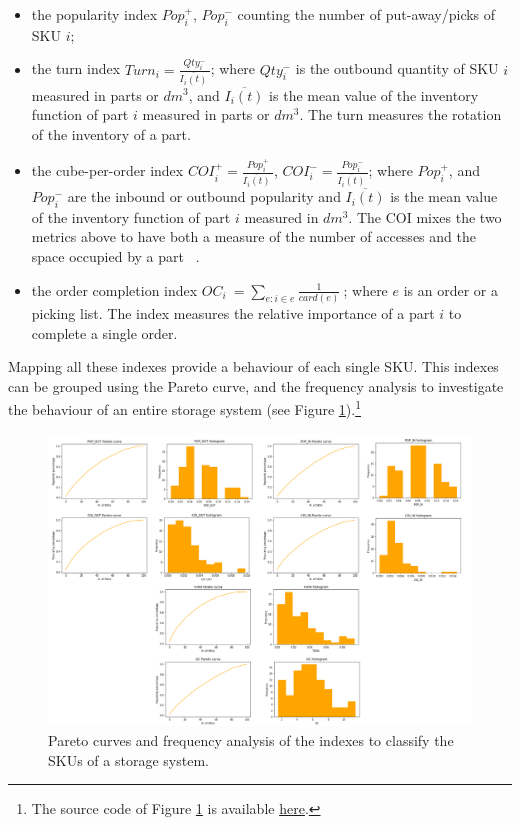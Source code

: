 \begin{itemize}
    \item the popularity index $Pop_i^+$, $Pop_i^-$ counting the number of put-away/picks of SKU $i$;
    \item the turn index $Turn_i=\frac{Qty_i^-}{\bar{I_i\left(t\right)}\ }$; where $Qty_i^-$ is the outbound quantity of SKU $i$ measured in parts or $dm^3$, and $\overline{I_i\left(t\right)}$ is the mean value of the inventory function of part $i$ measured in parts or $dm^3$. The turn measures the rotation of the inventory of a part.
    \item the cube-per-order index $COI_i^+=\frac{Pop_i^+}{\overline{I_i\left(t\right)}\ }$, $COI_i^-=\frac{Pop_i^-}{\overline{I_i\left(t\right)}\ }$; where $Pop_i^+$, and $Pop_i^-$ are the inbound or outbound popularity and $\overline{I_i\left(t\right)}$ is the mean value of the inventory function of part $i$ measured in $dm^3$. The COI mixes the two metrics above to have both a measure of the number of accesses and the space occupied by a part ~\cite{Haskett1963, Malmborg1990}.
    \item the order completion index $OC_i\ =\sum_{e:i\in e}\frac{1}{card(e)}\ $; where $e$ is an order or a  picking list. The index measures the relative importance of a part $i$ to complete a single order.
\end{itemize}

Mapping all these indexes provide a behaviour of each single SKU. This indexes can be grouped using the Pareto curve, and the frequency analysis to investigate the behaviour of an entire storage system (see Figure \ref{fig_wh_profile}).\footnote{The source code of Figure \ref{fig_wh_profile} is available \href{https://github.com/aletuf93/logproj/blob/master/examples/WH_02\%20Warehouse\%20indexes\%20assessment.ipynb}{here}.
}

\begin{figure}[hbt!]
\centering
\includegraphics[width=1.0\textwidth]{SectionWarehouses/control_figures/fig_wh_profile.png}
\captionsetup{type=figure}
\caption{Pareto curves and frequency analysis of the indexes to classify the SKUs of a storage system.}
\label{fig_wh_profile}
\end{figure}

